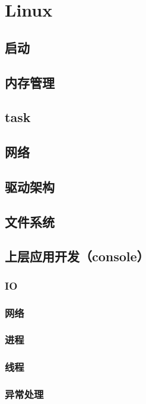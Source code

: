 \section{Linux}

\subsection{启动}
\subsection{内存管理}
\subsection{task}
\subsection{网络}
\subsection{驱动架构}
\subsection{文件系统}

\subsection{上层应用开发（console）}

\subsubsection{IO}
\subsubsection{网络}
\subsubsection{进程}
\subsubsection{线程}
\subsubsection{异常处理}
